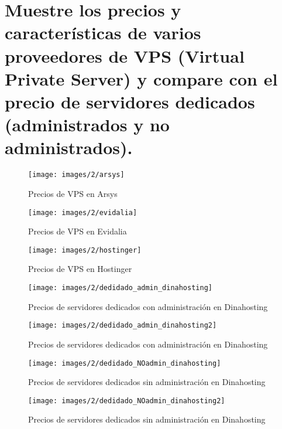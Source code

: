 \section{Muestre los precios y características de varios proveedores de VPS (Virtual Private Server) y compare con el precio de servidores dedicados (administrados y no administrados).\cite{03p21} \cite{03p22} \cite{03p23} \cite{03p24}}

\begin{figure}[H]
	\centering
	\texttt{[image: images/2/arsys]}
	\caption{Precios de VPS en Arsys}
	\label{fig:c0201}
\end{figure}


\begin{figure}[H]
	\centering
	\texttt{[image: images/2/evidalia]}
	\caption{Precios de VPS en Evidalia}
	\label{fig:c0202}
\end{figure}


\begin{figure}[H]
	\centering
	\texttt{[image: images/2/hostinger]}
	\caption{Precios de VPS en Hostinger}
	\label{fig:c0203}
\end{figure}


\begin{figure}[H]
	\centering
	\texttt{[image: images/2/dedidado\_admin\_dinahosting]}
	\caption{Precios de servidores dedicados con administración en Dinahosting}
	\label{fig:c0204}
\end{figure}

\begin{figure}[H]
	\centering
	\texttt{[image: images/2/dedidado\_admin\_dinahosting2]}
	\caption{Precios de servidores dedicados con administración en Dinahosting}
	\label{fig:c0205}
\end{figure}

\begin{figure}[H]
	\centering
	\texttt{[image: images/2/dedidado\_NOadmin\_dinahosting]}
	\caption{Precios de servidores dedicados sin administración en Dinahosting}
	\label{fig:c0206}
\end{figure}

\begin{figure}[H]
	\centering
	\texttt{[image: images/2/dedidado\_NOadmin\_dinahosting2]}
	\caption{Precios de servidores dedicados sin administración en Dinahosting}
	\label{fig:c0207}
\end{figure}


